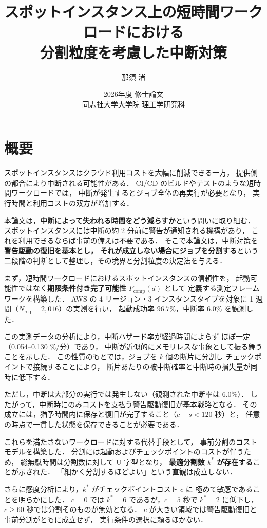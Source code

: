 \documentclass[11pt,a4paper]{ltjsreport}
\title{\vspace{-10mm}
スポットインスタンス上の短時間ワークロードにおける\\
分割粒度を考慮した中断対策}
\author{那須 渚}
\date{2026年度 修士論文\\[2mm] 同志社大学大学院 理工学研究科}
\newcommand{\Fcomp}{F_{\mathrm{comp}}}
\newcommand{\Nreq}{N_{\mathrm{req}}}
\begin{document}
\maketitle

\chapter*{概要}

スポットインスタンスはクラウド利用コストを大幅に削減できる一方，
提供側の都合により中断される可能性がある．
CI/CD のビルドやテストのような短時間ワークロードでは，
中断が発生するとジョブ全体の再実行が必要となり，
実行時間と利用コストの双方が増加する．

本論文は，\textbf{中断によって失われる時間をどう減らすか}という問いに取り組む．
スポットインスタンスには中断の約 2 分前に警告が通知される機構があり，
これを利用できるならば事前の備えは不要である．
そこで本論文は，中断対策を
\textbf{警告駆動の復旧を基本とし，
それが成立しない場合にジョブを分割する}という
二段階の判断として整理し，その境界と分割粒度の決定法を与える．

まず，短時間ワークロードにおけるスポットインスタンスの信頼性を，
起動可能性ではなく\textbf{期限条件付き完了可能性} $\Fcomp(d)$ として
定義する測定フレームワークを構築した．
AWS の 4 リージョン・3 インスタンスタイプを対象に
1 週間（$\Nreq = 2{,}016$）の実測を行い，
起動成功率 $96.7\%$，中断率 $6.0\%$ を観測した．

この実測データの分析により，中断ハザード率が経過時間によらず
ほぼ一定（0.054--0.130 \%/分）であり，
中断が近似的にメモリレスな事象として振る舞うことを示した．
この性質のもとでは，ジョブを $k$ 個の断片に分割し
チェックポイントで接続することにより，
断片あたりの被中断確率と中断時の損失量が同時に低下する．

ただし，中断は大部分の実行では発生しない（観測された中断率は $6.0\%$）．
したがって，中断時にのみコストを支払う警告駆動復旧が基本戦略となる．
その成立には，猶予時間内に保存と復旧が完了すること（$c + s < 120$ 秒）と，
任意の時点で一貫した状態を保存できることが必要である．

これらを満たさないワークロードに対する代替手段として，
事前分割のコストモデルを構築した．
分割には起動およびチェックポイントのコストが伴うため，
総無駄時間は分割数に対して U 字型となり，
\textbf{最適分割数 $k^{*}$ が存在する}ことが示された．
「細かく分割するほどよい」という直観は成立しない．

さらに感度分析により，$k^{*}$ がチェックポイントコスト $c$ に
極めて敏感であることを明らかにした．
$c = 0$ では $k^{*} = 6$ であるが，$c = 5$ 秒で $k^{*} = 2$ に低下し，
$c \geq 60$ 秒では分割そのものが無効となる．
$c$ が大きい領域では警告駆動復旧と事前分割がともに成立せず，
実行条件の選択に頼るほかない．
\end{document}
